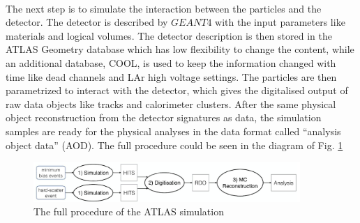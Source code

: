 \\The next step is to simulate the interaction between the particles and the detector. The detector is described by $GEANT4$\cite{Agostinelli:2002hh} with the input parameters like materials and logical volumes. The detector description is then stored in the ATLAS Geometry database which has low flexibility to change the content, while an additional database, COOL, is used to keep the information changed with time like dead channels and LAr high voltage settings. The particles are then parametrized to interact with the detector, which gives the digitalised output of raw data objects like tracks and calorimeter clusters. After the same physical object reconstruction from the detector signatures as data, the simulation samples are ready for the physical analyses in the data format called ``analysis object data'' (AOD). The full procedure could be seen in the diagram of Fig. \ref{Fig:simulation}
\begin{figure}[!h]                
	\includegraphics[width=0.9\textwidth]{Chapter2/simulation.png}
	\centering
	\begin{center}
		\caption{The full procedure of the ATLAS simulation}
		\label{Fig:simulation}            
	\end{center}
\end{figure}